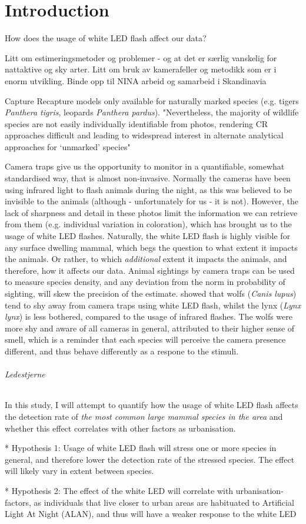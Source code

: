 \chapter{Introduction}


How does the usage of white LED flash affect our data?



Litt om estimeringsmetoder og problemer - og at det er særlig vanskelig for nattaktive og sky arter.
Litt om bruk av kamerafeller og metodikk som er i enorm utvikling. Binde opp til NINA arbeid og samarbeid i Skandinavia


Capture Recapture models only available for naturally marked species (e.g. tigers \textit{Panthera tigris}, leopards \textit{Panthera pardus}). 
"Nevertheless, the majority of wildlife species are not easily individually identifiable from photos, rendering CR approaches difficult and leading to widespread interest in alternate analytical approaches for ‘unmarked’ species" \cite{Burton2015} %


Camera traps give us the opportunity to monitor in a quantifiable, somewhat standardised way, that is almost non-invasive. 
Normally the cameras have been using infrared light to flash animals during the night, as this was believed to be invisible to the animals (although - unfortunately for us - it is not).
However, the lack of sharpness and detail in these photos limit the information we can retrieve from them (e.g. individual variation in coloration), which has brought us to the usage of white LED flashes.
Naturally, the white LED flash is highly visible for any surface dwelling mammal, which begs the question to what extent it impacts the animals. Or rather, to which \textit{additional} extent it impacts the animals, and therefore, how it affects our data. Animal sightings by camera traps can be used to measure species density, and any deviation from the norm in probability of sighting, will skew the precision of the estimate.
\cite{Beddari2019} showed that wolfs (\textit{Canis lupus}) tend to shy away from camera traps using white LED flash, whilst the lynx (\textit{Lynx lynx}) is less bothered, compared to the usage of infrared flashes. The wolfs were more shy and aware of all cameras in general, attributed to their higher sense of smell, which is a reminder that each species will perceive the camera presence different, and thus behave differently as a respone to the stimuli.

\subparagraph{Ledestjerne}
In this study, I will attempt to quantify how the usage of white LED flash affects the detection rate of \textsl{the most common large mammal species in the area} and whether this effect correlates with other factors as urbanisation.


* Hypothesis 1: Usage of white LED flash will stress one or more species in general, and therefore lower the detection rate of the stressed species. The effect will likely vary in extent between species.

* Hypothesis 2: The effect of the white LED will correlate with urbanisation-factors, as individuals that live closer to urban areas are habituated to Artificial Light At Night (ALAN), and thus will have a weaker response to the white LED


